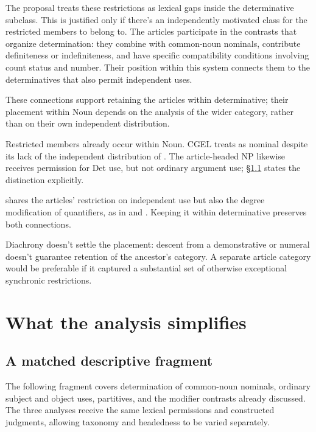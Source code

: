 \documentclass[12pt]{article}
\begin{document}
The proposal treats these restrictions as lexical gaps inside the determinative subclass. This is justified only if there's an independently motivated class for the restricted members to belong to. The articles participate in the contrasts that organize determination: they combine with common-noun nominals, contribute definiteness or indefiniteness, and have specific compatibility conditions involving count status and number. Their position within this system connects them to the determinatives that also permit independent uses.

These connections support retaining the articles within determinative; their placement within Noun depends on the analysis of the wider category, rather than on their own independent distribution.

Restricted members already occur within Noun. CGEL treats  as nominal despite its lack of the independent distribution of  \citep[470--471]{huddleston2002}. The article-headed NP likewise receives permission for Det use, but not ordinary argument use; §\ref{sec:fragment} states the distinction explicitly.

 shares the articles' restriction on independent use but also the degree modification of quantifiers, as in  and . Keeping it within determinative preserves both connections.

Diachrony doesn't settle the placement: descent from a demonstrative or numeral doesn't guarantee retention of the ancestor's category. A separate article category would be preferable if it captured a substantial set of otherwise exceptional synchronic restrictions.

\section{What the analysis simplifies}\label{sec:economy}

\subsection{A matched descriptive fragment}\label{sec:fragment}

The following fragment covers determination of common-noun nominals, ordinary subject and object uses, partitives, and the modifier contrasts already discussed. The three analyses receive the same lexical permissions and constructed judgments, allowing taxonomy and headedness to be varied separately.
\end{document}
